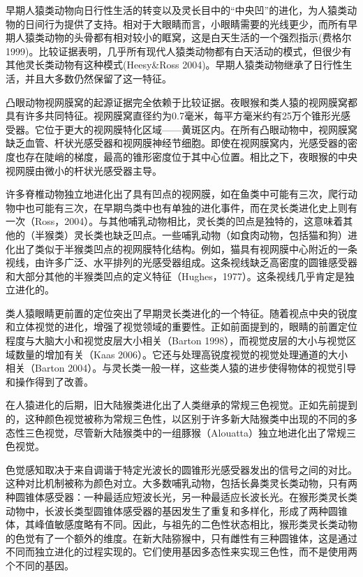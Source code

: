 早期人猿类动物向日行性生活的转变以及灵长目中的“中央凹”的进化，为人猿类动物的日间行为提供了支持。相对于大眼睛而言，小眼睛需要的光线更少，而所有早期人猿类动物的头骨都有相对较小的眶窝，这是白天生活的一个强烈指示(费格尔1999)。比较证据表明，几乎所有现代人猿类动物都有白天活动的模式，但很少有其他灵长类动物有这种模式(Heesy\&Ross 2004)。早期人猿类动物继承了日行性生活，并且大多数仍然保留了这一特征。

凸眼动物视网膜窝的起源证据完全依赖于比较证据。夜眼猴和类人猿的视网膜窝都具有许多共同特征。视网膜窝直径约为0.7毫米，每平方毫米约有25万个锥形光感受器。它位于更大的视网膜特化区域——黄斑区内。在所有凸眼动物中，视网膜窝缺乏血管、杆状光感受器和视网膜神经节细胞。即使在视网膜窝内，光感受器的密度也存在陡峭的梯度，最高的锥形密度位于其中心位置。相比之下，夜眼猴的中央视网膜由微小的杆状光感受器主导。

许多脊椎动物独立地进化出了具有凹点的视网膜，如在鱼类中可能有三次，爬行动物中也可能有三次，在早期鸟类中也有单独的进化事件，而在灵长类进化史上则有一次（Ross，2004）。与其他哺乳动物相比，灵长类的凹点是独特的，这意味着其他的（半猴类）灵长类也缺乏凹点。一些哺乳动物（如食肉动物，包括猫和狗）进化出了类似于半猴类凹点的视网膜特化结构。例如，猫具有视网膜中心附近的一条视线，由许多广泛、水平排列的光感受器组成。这条视线缺乏高密度的圆锥感受器和大部分其他的半猴类凹点的定义特征（Hughes，1977）。这条视线几乎肯定是独立进化的。

类人猿眼睛更前置的定位突出了早期灵长类进化的一个特征。随着视点中央的锐度和立体视觉的进化，增强了视觉领域的重要性。正如前面提到的，眼睛的前置定位程度与大脑大小和视觉皮层大小相关（Barton 1998），而视觉皮层的大小与视觉区域数量的增加有关（Kaas 2006）。它还与处理高锐度视觉的视觉处理通道的大小相关（Barton 2004）。与灵长类一般一样，这些类人猿的进步使得物体的视觉引导和操作得到了改善。

在人猿进化的后期，旧大陆猴类进化出了人类继承的常规三色视觉。正如先前提到的，这种颜色视觉被称为常规三色性，以区别于许多新大陆猴类中出现的不同的多态性三色视觉，尽管新大陆猴类中的一组豚猴（Alouatta）独立地进化出了常规三色视觉。

色觉感知取决于来自调谐于特定光波长的圆锥形光感受器发出的信号之间的对比。这种对比机制被称为颜色对立。大多数哺乳动物，包括长鼻类灵长类动物，只有两种圆锥体感受器：一种最适应短波长光，另一种最适应长波长光。在猴形类灵长类动物中，长波长类型圆锥体感受器的基因发生了重复和多样化，形成了两种圆锥体，其峰值敏感度略有不同。因此，与祖先的二色性状态相比，猴形类灵长类动物的色觉有了一个额外的维度。在新大陆猕猴中，只有雌性有三种圆锥体，这是通过不同而独立进化的过程实现的。它们使用基因多态性来实现三色性，而不是使用两个不同的基因。

